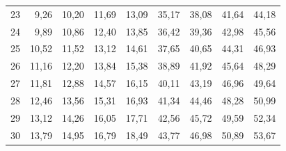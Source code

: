 \documentclass[a4paper,10pt]{extarticle}
\begin{document}
\begin{minipage}[t]{0.5\textwidth}
\begin{tabular}{r|rrrrrrrr}
23 & 9,26 & 10,20 & 11,69 & 13,09 & 35,17 & 38,08 & 41,64 & 44,18\\
24 & 9,89 & 10,86 & 12,40 & 13,85 & 36,42 & 39,36 & 42,98 & 45,56\\
25 & 10,52 & 11,52 & 13,12 & 14,61 & 37,65 & 40,65 & 44,31 & 46,93\\
26 & 11,16 & 12,20 & 13,84 & 15,38 & 38,89 & 41,92 & 45,64 & 48,29\\
27 & 11,81 & 12,88 & 14,57 & 16,15 & 40,11 & 43,19 & 46,96 & 49,64\\
28 & 12,46 & 13,56 & 15,31 & 16,93 & 41,34 & 44,46 & 48,28 & 50,99\\
29 & 13,12 & 14,26 & 16,05 & 17,71 & 42,56 & 45,72 & 49,59 & 52,34\\
30 & 13,79 & 14,95 & 16,79 & 18,49 & 43,77 & 46,98 & 50,89 & 53,67\\
\end{tabular}
\end{minipage}
\normalsize

\newpage
\end{document}
